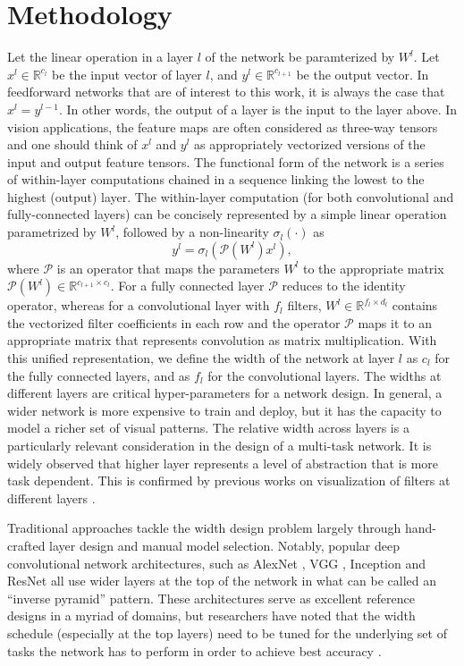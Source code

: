 \documentclass[10pt,twocolumn,letterpaper]{article}
\begin{document}
\section{Methodology}

Let the linear operation in a layer $l$ of the network be paramterized by $W^l$.
Let $x^l \in \mathbb{R}^{c_l}$ be the input vector of layer $l$, and $y^l \in \mathbb{R}^{c_{l+1}}$ be the output vector. In feedforward networks that are of interest to this work, it is always the case that $x^l = y^{l-1}$. In other words, the output of a layer is the input to the layer above. In vision applications, the feature maps are often considered as three-way tensors and one should think of $x^l$ and $y^l$ as  appropriately vectorized versions of the input and output feature tensors. The functional form of the network is a series of within-layer computations chained in a sequence linking the lowest to the highest (output) layer. The within-layer computation (for both convolutional and fully-connected layers) can be concisely represented by a simple linear operation parametrized by $W^l$, followed by a non-linearity $\sigma_l(\cdot)$ as 
\begin{equation}
\label{eqn:within_layer}
y^l = \sigma_l(\mathcal{P}(W^l) x^l),
\end{equation}
\noindent where $\mathcal{P}$ is an operator that maps the parameters $W^l$ to the appropriate matrix $\mathcal{P}(W^l)\in\mathbb{R}^{c_{l+1}\times c_l}$.
For a fully connected layer $\mathcal{P}$ reduces to the identity operator, whereas for a convolutional layer with $f_l$ filters, $W^l\in\mathbb{R}^{f_l\times d_l}$ contains the vectorized filter coefficients in each row and the operator $\mathcal{P}$ maps it to an appropriate matrix that represents convolution as matrix multiplication. 
With this unified representation, we define the width of the network at layer $l$ as $c_l$ for the fully connected layers, and as $f_l$ for the convolutional layers. 
The widths at different layers are critical hyper-parameters for a network design. In general, a wider network is more expensive to train and deploy, but it has the capacity to model a richer set of visual patterns. The relative width across layers is a particularly relevant consideration in the design of a multi-task network. It is widely observed that higher layer represents a level of abstraction that is more task dependent. This is confirmed by previous works on visualization of filters at different layers \cite{zeiler2014visualizing}.  

Traditional approaches tackle the width design problem largely through hand-crafted layer design and manual model selection. Notably, popular deep convolutional network architectures, such as AlexNet \cite{krizhevsky2012imagenet}, VGG \cite{simonyan2014very}, Inception \cite{szegedy2015going} and ResNet \cite{he2015deep}
all use wider layers at the top of the network in what can be called an ``inverse pyramid'' pattern. These architectures serve as excellent reference designs in a myriad of domains, but researchers have noted that the width schedule (especially at the top layers) need to be tuned for the underlying set of tasks the network has to perform in order to achieve best accuracy \cite{Misra16}.
\end{document}
